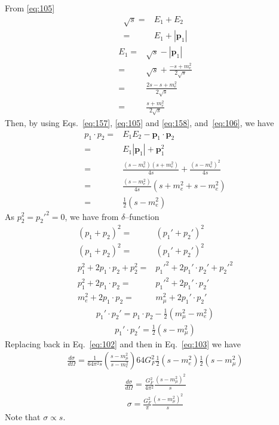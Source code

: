 From \eqref{eq:105}
\begin{align}
  \sqrt{s}=&E_1+E_2\nonumber\\
  =&E_1+|\mathbf{p}_1|
\end{align}
\begin{align}
  \label{eq:106}
  E_1=&\sqrt{s}-|\mathbf{p}_1|\nonumber\\
  =&\sqrt{s}+\frac{-s+m_e^2}{2\sqrt{s}}\nonumber\\
  =&\frac{2s-s+m_e^2}{2\sqrt{s}}\nonumber\\
  =&\frac{s+m_e^2}{2\sqrt{s}}
\end{align}
Then, by using Eqs.~\eqref{eq:157}, \eqref{eq:105} and \eqref{eq:158}, and~\eqref{eq:106},  we have
\begin{align}
  p_1\cdot p_2=&E_1E_2-\mathbf{p}_1\cdot\mathbf{p}_2\nonumber\\
  =&E_1|\mathbf{p}_1|+\mathbf{p}_1^2\nonumber\\
=&\frac{(s-m_e^2)(s+m_e^2)}{4s}+\frac{(s-m_e^2)^2}{4s}\nonumber\\
=&\frac{(s-m_e^2)}{4s}(s+m_e^2+s-m_e^2)\nonumber\\
=&\frac{1}{2}(s-m_e^2) 
\end{align}
As $p_2^2={p_2'}^2=0$, we have from $\delta$--function
\begin{align}
  (p_1+p_2)^2=&(p_1'+p_2')^2\nonumber\\
  (p_1+p_2)^2=&(p_1'+p_2')^2\nonumber\\
  p_1^2+2p_1\cdot p_2+p_2^2=&{p_1'}^2+2p_1'\cdot p_2'+{p_2'}^2\nonumber\\
  p_1^2+2p_1\cdot p_2=&{p_1'}^2+2p_1'\cdot p_2'\nonumber\\
  m_e^2+2p_1\cdot p_2=&m_\mu^2+2p_1'\cdot p_2'
\end{align}
\begin{align}
  p_1'\cdot p_2'=p_1\cdot p_2-\frac{1}{2}(m_\mu^2-m_e^2)
\end{align}
\begin{align}
  p_1'\cdot p_2'=\frac{1}{2}(s-m_\mu^2) 
\end{align}
Replacing back in Eq.~\eqref{eq:102} and then in Eq.~\eqref{eq:103} we have
\begin{align}
  \frac{d\sigma}{d\Omega}=\frac{1}{64\pi^2s}\left(\frac{s-m_\mu^2}{s-m_e^2}\right)
64G_F^2\frac{1}{2}(s-m_e^2)\frac{1}{2}(s-m_\mu^2)
\end{align} 
\begin{align}
    \frac{d\sigma}{d\Omega}=\frac{G_F^2}{4\pi^2}\frac{(s-m_\mu^2)^2}{s}
\end{align}
\begin{align}
\sigma  =\frac{G_F^2}{\pi}\frac{(s-m_\mu^2)^2}{s}
\end{align}
Note that $\sigma\propto s$.



